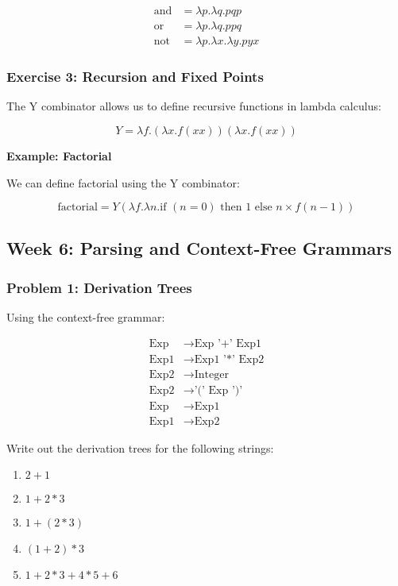 \documentclass{article}
\theoremstyle{plain}
\theoremstyle{definition}
\theoremstyle{remark}
\begin{document}
\begin{align}
\text{and} &= \lambda p.\lambda q.p q p \\
\text{or} &= \lambda p.\lambda q.p p q \\
\text{not} &= \lambda p.\lambda x.\lambda y.p y x
\end{align}

\subsubsection{Exercise 3: Recursion and Fixed Points}

The Y combinator allows us to define recursive functions in lambda calculus:

$$Y = \lambda f.(\lambda x.f(x x))(\lambda x.f(x x))$$

\textbf{Example: Factorial}

We can define factorial using the Y combinator:

$$\text{factorial} = Y(\lambda f.\lambda n.\text{if } (n = 0) \text{ then } 1 \text{ else } n \times f(n-1))$$

\subsection{Week 6: Parsing and Context-Free Grammars}

\subsubsection{Problem 1: Derivation Trees}

Using the context-free grammar:

\begin{align}
\text{Exp} &\to \text{Exp '+' Exp1} \\
\text{Exp1} &\to \text{Exp1 '*' Exp2} \\
\text{Exp2} &\to \text{Integer} \\
\text{Exp2} &\to \text{'(' Exp ')'} \\
\text{Exp} &\to \text{Exp1} \\
\text{Exp1} &\to \text{Exp2}
\end{align}

Write out the derivation trees for the following strings:

\begin{enumerate}[label=(\alph*)]
    \item $2+1$
    \item $1+2*3$
    \item $1+(2*3)$
    \item $(1+2)*3$
    \item $1+2*3+4*5+6$
\end{enumerate}
\end{document}
